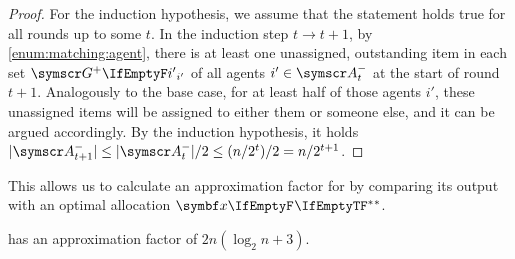 \begin{proof}
	For the induction hypothesis, we assume that the statement holds true for all rounds up to some \(t\).
	In the induction step \(t \to t+1\), by \cref{enum:matching:agent}, there is at least one unassigned, outstanding item in each set \(\overlygoodset[i']\) of all agents \(i' \in \unluckyagents{t}\) at the start of round \(t+1\).
	Analogously to the base case, for at least half of those agents \(i'\), these unassigned items will be assigned to either them or someone else, and it can be argued accordingly.
	By the induction hypothesis, it holds \(\abs{\unluckyagents{t+1}} \le \abs{\unluckyagents{t}}/2 \le (n/2^t)/2 = n/2^{t+1}\).
\end{proof}

This allows us to calculate an approximation factor for \RepReMatch{} by comparing its output with an optimal allocation \(\alloc*[][]\).
\begin{theorem}
	\label{th:reprematch}
	\RepReMatch{} has an approximation factor of \(2n (\log_2 n + 3)\).
\end{theorem}
